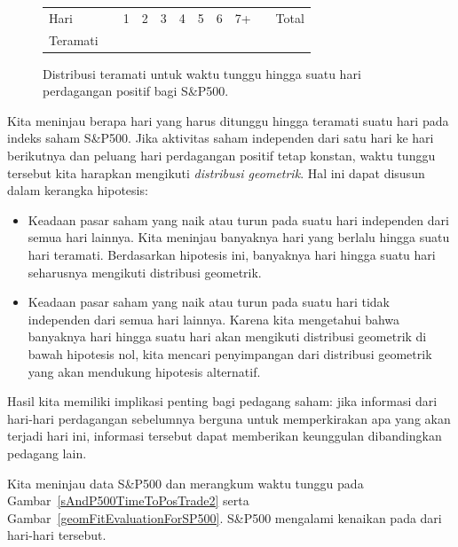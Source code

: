 \begin{figure}[h]
\centering
\begin{tabular}{ll ccc ccc c ll}
  \hline
  Hari	 & \hspace{2mm} & 1 & 2 & 3 & 4 & 5 & 6 & 7+ &
      \hspace{2mm} & Total \\
  Teramati &		& \spdaysA{} & \spdaysB{} & \spdaysC{} &
      \spdaysD{} & \spdaysE{} & \spdaysF{} & \spdaysG{} & &
      \spdays{} \\
  \hline
\end{tabular}
\caption{Distribusi teramati untuk waktu tunggu hingga
    suatu hari perdagangan positif bagi S\&P500.}
\label{sAndP500TimeToPosTrade}
\end{figure}

Kita meninjau berapa hari yang harus ditunggu hingga teramati suatu hari  pada indeks saham S\&P500. Jika aktivitas saham independen dari satu hari ke hari berikutnya dan peluang hari perdagangan positif tetap konstan, waktu tunggu tersebut kita harapkan mengikuti \emph{distribusi geometrik}. Hal ini dapat disusun dalam kerangka hipotesis:
\begin{itemize}
\item[$H_0$:] Keadaan pasar saham yang naik atau turun pada suatu hari independen dari semua hari lainnya. Kita meninjau banyaknya hari yang berlalu hingga suatu hari  teramati. Berdasarkan hipotesis ini, banyaknya hari hingga suatu hari  seharusnya mengikuti distribusi geometrik.
\item[$H_A$:] Keadaan pasar saham yang naik atau turun pada suatu hari tidak independen dari semua hari lainnya. Karena kita mengetahui bahwa banyaknya hari hingga suatu hari  akan mengikuti distribusi geometrik di bawah hipotesis nol, kita mencari penyimpangan dari distribusi geometrik yang akan mendukung hipotesis alternatif.
\end{itemize}
Hasil kita memiliki implikasi penting bagi pedagang saham: jika informasi dari hari-hari perdagangan sebelumnya berguna untuk memperkirakan apa yang akan terjadi hari ini, informasi tersebut dapat memberikan keunggulan dibandingkan pedagang lain.

Kita meninjau data S\&P500 dan merangkum waktu tunggu pada Gambar~\ref{sAndP500TimeToPosTrade2} serta Gambar~\ref{geomFitEvaluationForSP500}. S\&P500 mengalami kenaikan pada \spUpPerc{} dari hari-hari tersebut.

